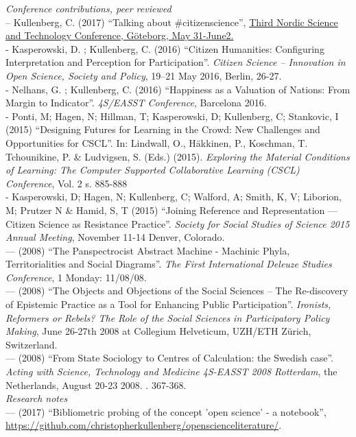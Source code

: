 \documentclass[a4paper,11pt,oneside]{article}
\begin{document}
  \noindent \emph{Conference contributions, peer reviewed}\\
  – Kullenberg, C. (2017) ``Talking about #citizenscience'', \href{http://socav.gu.se/english/research/third-nordic-science-and-technology-studies-conference}{Third Nordic Science and Technology Conference, Göteborg, May 31-June2.}\\
  - Kasperowski, D. ; Kullenberg, C. (2016) ``Citizen Humanities: Configuring Interpretation and Perception for Participation''. \emph{Citizen Science – Innovation in Open Science, Society and Policy}, 19–21 May 2016, Berlin, 26-27.\\
  - Nelhans, G. ; Kullenberg, C. (2016) ``Happiness as a Valuation of Nations: From Margin to Indicator''. \emph{4S/EASST Conference}, Barcelona 2016.\\
  - Ponti, M; Hagen, N; Hillman, T; Kasperowski, D; Kullenberg, C; Stankovic, I (2015) ``Designing Futures for Learning in the Crowd: New Challenges and Opportunities for CSCL''. In: Lindwall, O., Häkkinen, P., Koschman, T. Tchounikine, P. & Ludvigsen, S. (Eds.) (2015). \emph{Exploring the Material Conditions of Learning: The Computer Supported Collaborative Learning (CSCL) Conference}, Vol. 2 s. 885-888\\
  - Kasperowski, D; Hagen, N; Kullenberg, C; Walford, A; Smith, K, V; Liborion, M; Prutzer N & Hamid, S, T (2015) ``Joining Reference and Representation — Citizen Science as Resistance Practice''. \emph{Society for Social Studies of Science 2015 Annual Meeting}, November 11-14 Denver, Colorado.\\
  --- (2008) ``The Panspectrocist Abstract Machine - Machinic Phyla, Territorialities and Social Diagrams''. \emph{The First International Deleuze Studies Conference}, 1 Monday: 11/08/08.\\
  --- (2008) ``The Objects and Objections of the Social Sciences – The Re-discovery of Epistemic Practice as a Tool for Enhancing Public Participation''. \emph{Ironists, Reformers or Rebels? The Role of the Social Sciences in Participatory Policy Making}, June 26-27th 2008 at Collegium Helveticum, UZH/ETH Zürich, Switzerland.\\
  --- (2008) ``From State Sociology to Centres of Calculation: the Swedish case''. \emph{Acting with Science, Technology and Medicine 4S-EASST 2008 Rotterdam}, the Netherlands, August 20-23 2008. . 367-368.\\

  \noindent  \emph{Research notes} \\
    --- (2017) ``Bibliometric probing of the concept 'open science' - a notebook'', \\
    \href{https://github.com/christopherkullenberg/openscienceliterature/}{https://github.com/christopherkullenberg/openscienceliterature/}. \\
\end{document}

